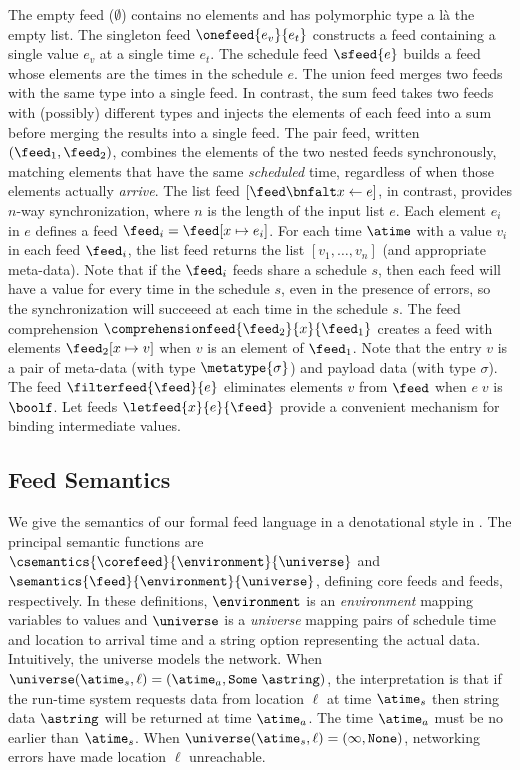 The empty feed ($\emptyset$) contains no elements and has polymorphic
type a l\`a the empty list.  The singleton feed $\onefeed{e_v}{e_t}$
constructs a feed containing a single value $e_v$ at a single time
$e_t$.  The schedule feed $\sfeed{e}$ builds a feed whose elements 
are the times in the schedule $e$.
The union feed merges two feeds with the same type
into a single feed.  In contrast, the sum feed takes two feeds
with (possibly) different types and injects the elements of each feed
into a sum before merging the results into a single feed.  
The pair feed, written $(\feed_1, \feed_2)$, combines the elements of
the two nested feeds synchronously, matching elements that have the
same {\em scheduled} time, regardless of when those elements
actually {\em arrive}.
The list feed $[\feed \bnfalt x \leftarrow e ]$, in contrast, provides
$n$-way synchronization, where $n$ is the length of the input list
$e$.  Each element $e_i$ in $e$ defines a feed $\feed_i = \feed[x \mapsto e_i]$.
For each time $\atime$ with a value $v_i$ in each feed $\feed_i$, the
list feed returns the list $[v_1, \ldots, v_n]$ (and appropriate meta-data).  Note that if the
$\feed_i$ feeds share a schedule $s$, then each feed will have a value
for every time in the schedule $s$, even in the presence of errors, so
the synchronization will succeeed at each time in the schedule $s$.
The feed comprehension $\comprehensionfeed{\feed_2}{x}{\feed_1}$
creates a feed with elements $\feed_2[x \mapsto v]$ when $v$ is an
element of $\feed_1$. Note that the entry $v$ is a pair of meta-data
(with type $\metatype{\sigma}$) and payload data (with type $\sigma$).
The feed $\filterfeed{\feed}{e}$ eliminates elements $v$ from $\feed$ when
$e\; v$ is $\boolf$.  Let feeds $\letfeed{x}{e}{\feed}$
provide a convenient mechanism for binding intermediate values. 



\subsection{Feed Semantics}
We give the semantics of our formal feed language in 
a denotational style in .  The principal semantic functions are
$\csemantics{\corefeed}{\environment}{\universe}$ and
$\semantics{\feed}{\environment}{\universe}$, defining core feeds and
feeds, respectively.  In these definitions,
$\environment$ is an {\em environment} mapping variables to values
and $\universe$ is a {\em universe} mapping pairs of
schedule time and location to arrival time and a string option
representing the actual data.
Intuitively, the universe models the network.
When $\universe (\atime_s, \ell) = (\atime_a, \mathtt{Some} \; \astring)$,
 the interpretation is that if the run-time system requests data
from location $\ell$ at time $\atime_s$ then string data $\astring$
will be returned at time $\atime_a$.  The time $\atime_a$ must be
no earlier than $\atime_s$.
When $\universe (\atime_s, \ell) = (\infty, \mathtt{None})$,
networking errors have made location $\ell$ unreachable.

